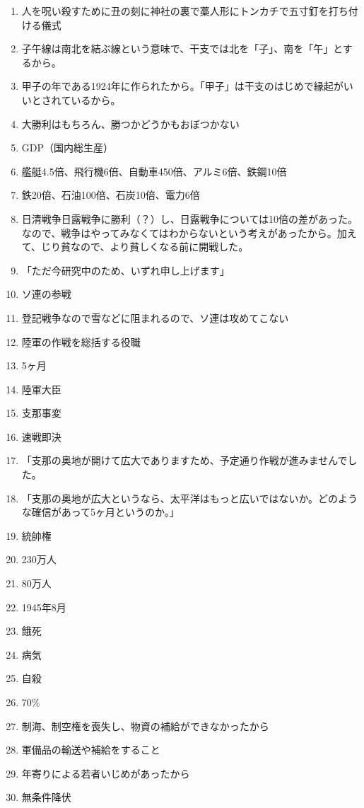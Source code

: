 \documentclass[]{jsarticle}
\begin{document}
\begin{enumerate}
	\item 人を呪い殺すために丑の刻に神社の裏で藁人形にトンカチで五寸釘を打ち付ける儀式
	\item 子午線は南北を結ぶ線という意味で、干支では北を「子」、南を「午」とするから。
	\item 甲子の年である1924年に作られたから。「甲子」は干支のはじめで縁起がいいとされているから。
		\\
	\item 大勝利はもちろん、勝つかどうかもおぼつかない
	\item GDP（国内総生産）
	\item 艦艇4.5倍、飛行機6倍、自動車450倍、アルミ6倍、鉄鋼10倍
	\item 鉄20倍、石油100倍、石炭10倍、電力6倍
	\item 日清戦争日露戦争に勝利（？）し、日露戦争については10倍の差があった。なので、戦争はやってみなくてはわからないという考えがあったから。加えて、じり貧なので、より貧しくなる前に開戦した。
	\item 「ただ今研究中のため、いずれ申し上げます」
	\item ソ連の参戦
	\item 登記戦争なので雪などに阻まれるので、ソ連は攻めてこない
	\item 陸軍の作戦を総括する役職
	\item 5ヶ月
	\item 陸軍大臣
	\item 支那事変
	\item 速戦即決
	\item 「支那の奥地が開けて広大でありますため、予定通り作戦が進みませんでした。
	\item 「支那の奥地が広大というなら、太平洋はもっと広いではないか。どのような確信があって5ヶ月というのか。」
	\item 統帥権
	\item 230万人
	\item 80万人
	\item 1945年8月
	\item 餓死
	\item 病気
	\item 自殺
	\item 70\%
	\item 制海、制空権を喪失し、物資の補給ができなかったから
	\item 軍備品の輸送や補給をすること
	\item 年寄りによる若者いじめがあったから
		\\
	\item 無条件降伏

\end{enumerate}
\end{document}
